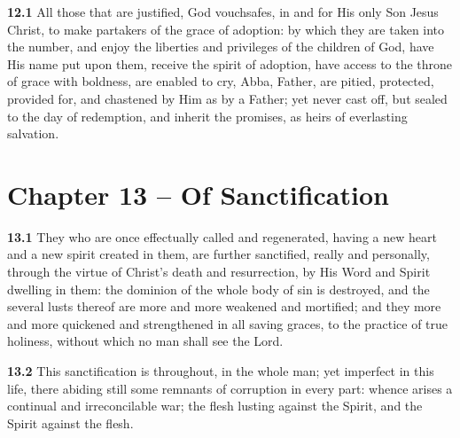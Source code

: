\par\textbf{12.1} All those that are justified, God vouchsafes, in and for His only Son Jesus Christ, to make partakers of the grace of adoption: by which they are taken into the number, and enjoy the liberties and privileges of the children of God, have His name put upon them, receive the spirit of adoption, have access to the throne of grace with boldness, are enabled to cry, Abba, Father, are pitied, protected, provided for, and chastened by Him as by a Father; yet never cast off, but sealed to the day of redemption, and inherit the promises, as heirs of everlasting salvation.  

\section{Chapter 13 -- Of Sanctification}

\par\textbf{13.1} They who are once effectually called and regenerated, having a new heart and a new spirit created in them, are further sanctified, really and personally, through the virtue of Christ's death and resurrection, by His Word and Spirit dwelling in them: the dominion of the whole body of sin is destroyed, and the several lusts thereof are more and more weakened and mortified; and they more and more quickened and strengthened in all saving graces, to the practice of true holiness, without which no man shall see the Lord.   

\par\textbf{13.2} This sanctification is throughout, in the whole man; yet imperfect in this life, there abiding still some remnants of corruption in every part: whence arises a continual and irreconcilable war; the flesh lusting against the Spirit, and the Spirit against the flesh.   

